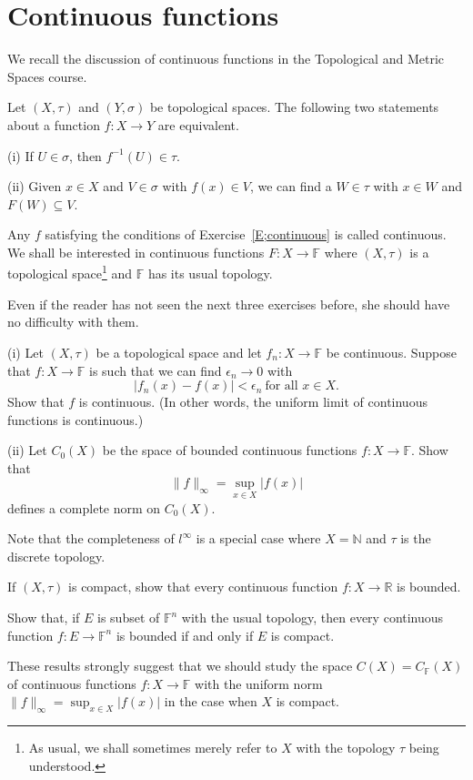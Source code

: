 \section{Continuous functions} We recall the discussion of continuous
functions in the Topological and Metric Spaces course.
\begin{exercise}\label{E;continuous} Let $(X,\tau)$ 
and $(Y,\sigma)$ be topological
spaces. The following two statements about a function
$f:X\rightarrow Y$ are equivalent.

(i) If $U\in\sigma$, then $f^{-1}(U)\in\tau$.

(ii) Given $x\in X$ and $V\in\sigma$ with $f(x)\in V$,
we can find a $W\in\tau$ with $x\in W$ and $F(W)\subseteq V$.
\end{exercise}  
Any $f$ satisfying the conditions of Exercise~\ref{E;continuous}
is called continuous. We shall be interested 
in continuous functions $F:X\rightarrow{\mathbb F}$
where $(X,\tau)$ is a topological space\footnote{As usual,
we shall sometimes merely refer to $X$
with the topology $\tau$ being understood.} 
and ${\mathbb F}$
has its usual topology. 

Even if the reader has not
seen the next three exercises before, she should have no difficulty
with them.
\begin{exercise} (i) Let $(X,\tau)$ be a topological space
and let $f_{n}:X\rightarrow{\mathbb F}$ be continuous. Suppose
that $f:X\rightarrow{\mathbb F}$ is such that we can find 
$\epsilon_{n}\rightarrow 0$ with
\[|f_{n}(x)-f(x)|<\epsilon_{n}\ \text{for all $x\in X$}.\]
Show that $f$ is continuous. (In other words, the uniform limit
of continuous functions is continuous.)

(ii) Let $C_{0}(X)$ be the space of bounded continuous
functions $f:X\rightarrow{\mathbb F}$.
Show that
\[\|f\|_{\infty}=\sup_{x\in X}|f(x)|\]
defines a complete norm on $C_{0}(X)$.
\end{exercise}
Note that the completeness of $l^{\infty}$ is a special case
where $X={\mathbb N}$ and $\tau$ is the discrete topology.
\begin{exercise} If $(X,\tau)$ is compact, show that every continuous
function $f:X\rightarrow{\mathbb R}$ is bounded.
\end{exercise}
\begin{exercise} Show that, if $E$ is subset of ${\mathbb F}^{n}$
with the usual topology, then every continuous function
$f:E\rightarrow{\mathbb F}^{n}$ is bounded if and only if
$E$ is compact.
\end{exercise}
These results strongly suggest that we should study
the space $C(X)=C_{\mathbb F}(X)$ of continuous functions
$f:X\rightarrow{\mathbb F}$ with the uniform norm
$\|f\|_{\infty}=\sup_{x\in X}|f(x)|$ in the case when $X$ is compact.

